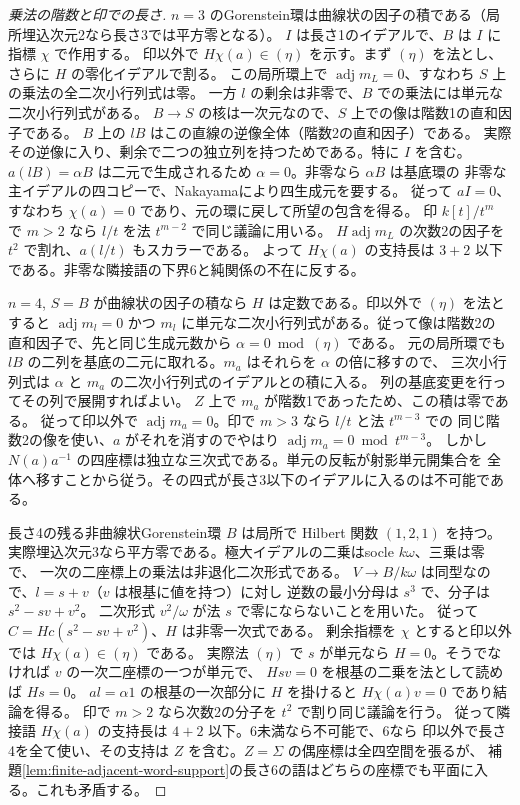 \begin{proof}[乗法の階数と印での長さ]
$n=3$ のGorenstein環は曲線状の因子の積である（局所埋込次元2なら長さ3では平方零となる）。
$I$ は長さ1のイデアルで、$B$ は $I$ に指標 $\chi$ で作用する。
印以外で $H\chi(a)\in(\eta)$ を示す。まず $(\eta)$ を法とし、さらに $H$ の零化イデアルで割る。
この局所環上で $\operatorname{adj}m_L=0$、すなわち $S$ 上の乗法の全二次小行列式は零。
一方 $l$ の剰余は非零で、$B$ での乗法には単元な二次小行列式がある。
$B\to S$ の核は一次元なので、$S$ 上での像は階数1の直和因子である。
$B$ 上の $lB$ はこの直線の逆像全体（階数2の直和因子）である。
実際その逆像に入り、剰余で二つの独立列を持つためである。特に $I$ を含む。
$a(lB)=\alpha B$ は二元で生成されるため $\alpha=0$。非零なら $\alpha B$ は基底環の
非零な主イデアルの四コピーで、Nakayamaにより四生成元を要する。
従って $aI=0$、すなわち $\chi(a)=0$ であり、元の環に戻して所望の包含を得る。
印 $k[t]/t^m$ で $m>2$ なら $l/t$ を法 $t^{m-2}$ で同じ議論に用いる。
$H\operatorname{adj}m_L$ の次数2の因子を $t^2$ で割れ、$a(l/t)$ もスカラーである。
よって $H\chi(a)$ の支持長は $3+2$ 以下である。非零な隣接語の下界6と純関係の不在に反する。

$n=4$, $S=B$ が曲線状の因子の積なら $H$ は定数である。印以外で $(\eta)$ を法とすると
$\operatorname{adj}m_l=0$ かつ $m_l$ に単元な二次小行列式がある。従って像は階数2の
直和因子で、先と同じ生成元数から $\alpha=0\bmod(\eta)$ である。
元の局所環でも $lB$ の二列を基底の二元に取れる。$m_a$ はそれらを $\alpha$ の倍に移すので、
三次小行列式は $\alpha$ と $m_a$ の二次小行列式のイデアルとの積に入る。
列の基底変更を行ってその列で展開すればよい。
$Z$ 上で $m_a$ が階数1であったため、この積は零である。
従って印以外で $\operatorname{adj}m_a=0$。印で $m>3$ なら $l/t$ と法 $t^{m-3}$ での
同じ階数2の像を使い、$a$ がそれを消すのでやはり $\operatorname{adj}m_a=0\bmod t^{m-3}$。
しかし $N(a)a^{-1}$ の四座標は独立な三次式である。単元の反転が射影単元開集合を
全体へ移すことから従う。その四式が長さ3以下のイデアルに入るのは不可能である。

長さ4の残る非曲線状Gorenstein環 $B$ は局所で Hilbert 関数 $(1,2,1)$ を持つ。
実際埋込次元3なら平方零である。極大イデアルの二乗はsocle $k\omega$、三乗は零で、
一次の二座標上の乗法は非退化二次形式である。
$V\to B/k\omega$ は同型なので、$l=s+v$（$v$ は根基に値を持つ）に対し
逆数の最小分母は $s^3$ で、分子は $s^2-sv+v^2$。
二次形式 $v^2/\omega$ が法 $s$ で零にならないことを用いた。
従って $C=H c(s^2-sv+v^2)$、$H$ は非零一次式である。
剰余指標を $\chi$ とすると印以外では $H\chi(a)\in(\eta)$ である。
実際法 $(\eta)$ で $s$ が単元なら $H=0$。そうでなければ $v$ の一次二座標の一つが単元で、
$Hsv=0$ を根基の二乗を法として読めば $Hs=0$。
$al=\alpha 1$ の根基の一次部分に $H$ を掛けると $H\chi(a)v=0$ であり結論を得る。
印で $m>2$ なら次数2の分子を $t^2$ で割り同じ議論を行う。
従って隣接語 $H\chi(a)$ の支持長は $4+2$ 以下。6未満なら不可能で、6なら
印以外で長さ4を全て使い、その支持は $Z$ を含む。$Z=\Sigma$ の偶座標は全四空間を張るが、
補題\ref{lem:finite-adjacent-word-support}の長さ6の語はどちらの座標でも平面に入る。これも矛盾する。
\end{proof}

